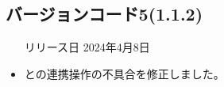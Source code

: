 \subsection*{バージョンコード5(1.1.2)}
\begin{itemize}
    \item[リリース日] 2024年4月8日
\end{itemize}

\new \par
\change \par
\fix
\begin{itemize}
    \item \mi との連携操作の不具合を修正しました。
\end{itemize}